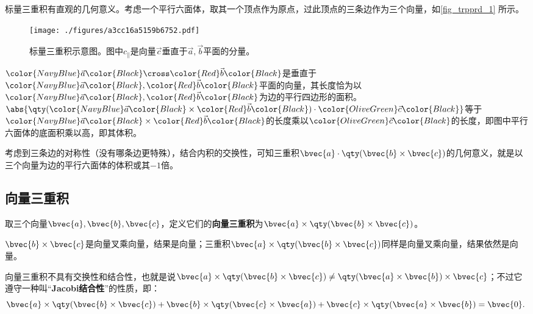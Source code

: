 标量三重积有直观的几何意义。考虑一个平行六面体，取其一个顶点作为原点，过此顶点的三条边作为三个向量，如\autoref{fig_trpprd_1} 所示。




\begin{figure}[ht]
\centering
\texttt{[image: ./figures/a3cc16a5159b6752.pdf]}
\caption{标量三重积示意图。图中$c_\parallel$是向量$\vec{c}$垂直于$\vec{a}, \vec{b}$平面的分量。} \label{fig_trpprd_1}
\end{figure}

$\color{NavyBlue}\vec{a}\color{Black}\cross\color{Red}\vec{b}\color{Black}$是垂直于$\color{NavyBlue}\vec{a}\color{Black}, \color{Red}\vec{b}\color{Black}$平面的向量，其长度恰为以$\color{NavyBlue}\vec{a}\color{Black}, \color{Red}\vec{b}\color{Black}$为边的平行四边形的面积。$\abs{\qty(\color{NavyBlue}\vec{a}\color{Black}\times\color{Red}\vec{b}\color{Black})\cdot\color{OliveGreen}\vec{c}\color{Black}}$等于$\color{NavyBlue}\vec{a}\color{Black}\times\color{Red}\vec{b}\color{Black}$的长度乘以$\color{OliveGreen}\vec{c}\color{Black}$的长度，即图中平行六面体的底面积乘以高，即其体积。

考虑到三条边的对称性（没有哪条边更特殊），结合内积的交换性，可知三重积$\bvec{a}\cdot\qty(\bvec{b}\times\bvec{c})$的几何意义，就是以三个向量为边的平行六面体的体积或其$-1$倍。





\subsection{向量三重积}


取三个向量$\bvec{a}, \bvec{b}, \bvec{c}$，定义它们的\textbf{向量三重积}为$\bvec{a}\times\qty(\bvec{b}\times\bvec{c})$。

$\bvec{b}\times\bvec{c}$是向量叉乘向量，结果是向量；三重积$\bvec{a}\times\qty(\bvec{b}\times\bvec{c})$同样是向量叉乘向量，结果依然是向量。



向量三重积不具有交换性和结合性，也就是说$\bvec{a}\times\qty(\bvec{b}\times\bvec{c})\neq \qty(\bvec{a}\times\bvec{b})\times\bvec{c}$；不过它遵守一种叫“\textbf{Jacobi结合性}”的性质，即：
\begin{equation}
\bvec{a}\times\qty(\bvec{b}\times\bvec{c})+\bvec{b}\times\qty(\bvec{c}\times\bvec{a})+\bvec{c}\times\qty(\bvec{a}\times\bvec{b})=\bvec{0}. ~
\end{equation}





